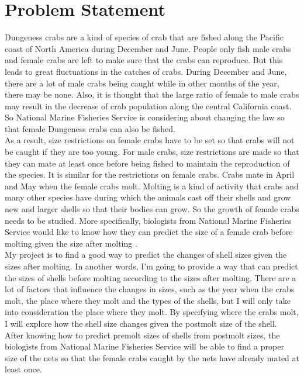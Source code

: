 \documentclass[12pt,letterpaper]{article}
\theoremstyle{definition}
\begin{document}
\section{Problem Statement}
Dungeness crabs are a kind of species of crab that are fished along the Pacific coast of North America during December and June. People only fish male crabs and female crabs are left to make sure that the crabs can reproduce. But this leads to great fluctuations in the catches of crabs. During December and June, there are a lot of male crabs being caught while in other months of the year, there may be none. Also, it is thought that the large ratio of female to male crabs may result in the decrease of crab population along the central California coast. So National Marine Fisheries Service is considering about changing the law so that female Dungeness crabs can also be fished.\\
As a result, size restrictions on female crabs have to be set so that crabs will not be caught if they are too young. For male crabs, size restrictions are made so that they can mate at least once before being fished to maintain the reproduction of the species. It is similar for the restrictions on female crabs. Crabs mate in April and May when the female crabs molt. Molting is a kind of activity that crabs and many other species have during which the animals cast off their shells and grow new and larger shells so that their bodies can grow. So the growth of female crabs needs to be studied. More specifically, biologists from National Marine Fisheries Service would like to know how they can predict the size of a female crab before molting given the size after molting \cite{deb}.\\
My project is to find a good way to predict the changes of shell sizes given the sizes after molting. In another words, I'm going to provide a way that can predict the sizes of shells before molting according to the sizes after molting. There are a lot of factors that influence the changes in sizes, such as the year when the crabs molt, the place where they molt and the types of the shells, but I will only take into consideration the place where they molt. By specifying where the crabs molt, I will explore how the shell size changes given the postmolt size of the shell.\\
After knowing how to predict premolt sizes of shells from postmolt sizes, the biologists from National Marine Fisheries Service will be able to find a proper size of the nets so that the female crabs caught by the nets have already mated at least once.
\end{document}

